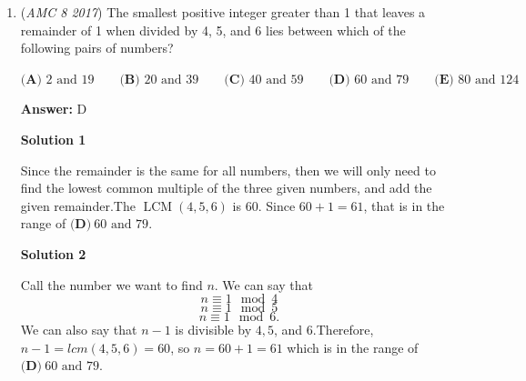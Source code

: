 \begin{enumerate}
 $\textbf{(A) }148\qquad\textbf{(B) }324\qquad\textbf{(C) }361\qquad\textbf{(D) }1296\qquad\textbf{(E) }1369$

 \textbf{Answer: }C



\textbf{Solution 1}

Since the number of tiles lying on both diagonals is $37$, counting one tile twice, there are $37=2x-1\implies x=19$ tiles on each side, where x is the number of tiles on the side length of the square. This is because the number of tiles on the square's diagonal is equal to the number of tiles on the square's side length.Therefore, our answer is $19^2=\boxed{\textbf{(C)}\ 361}$.

 



\textbf{Solution 2}

Visualize it as 4 separate diagonals connecting to one square in the middle. Each square on the diagonal corresponds to one square of horizontal/vertical distance (because it's a square). So, we figure out the length of each separate diagonal, multiply by two, and then add 1. (Realize that we can just join two of the separate diagonals on opposite sides together to save some time in calculations.) Therefore, the edge length is: 
 \[\frac{37-1}{4} \cdot 2 + 1 = 19\]Thus, our solution is $19^2 = \boxed{\textbf{(C)}\ 361}$.

 \textbf{See Also:} 


	\item (\textit{AMC 8 2017}) The smallest positive integer greater than 1 that leaves a remainder of 1 when divided by 4, 5, and 6 lies between which of the following pairs of numbers?


 $\textbf{(A) }2\text{ and }19\qquad\textbf{(B) }20\text{ and }39\qquad\textbf{(C) }40\text{ and }59\qquad\textbf{(D) }60\text{ and }79\qquad\textbf{(E) }80\text{ and }124$

 \textbf{Answer: }D



\textbf{Solution 1}

Since the remainder is the same for all numbers, then we will only need to find the lowest common multiple of the three given numbers, and add the given remainder.The $\operatorname{LCM}(4,5,6)$ is $60$. Since $60+1=61$, that is in the range of $\boxed{\textbf{(D)}\ \text{60 and 79}}.$




\textbf{Solution 2}

Call the number we want to find $n$. We can say that
 \[n \equiv 1 \mod 4\]
 \[n \equiv 1 \mod 5\]
 \[n \equiv 1 \mod 6.\]We can also say that $n-1$ is divisible by $4,5$, and $6.$Therefore, $n-1=lcm(4,5,6)=60$, so $n=60+1=61$ which is in the range of $\boxed{\textbf{(D)}\ \text{60 and 79}}.$




\end{enumerate}
